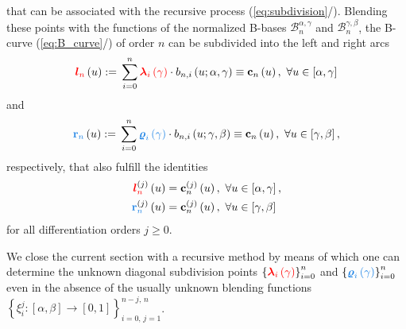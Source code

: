\documentclass[b5paper, twosided]{book}
\newcommand{\Black}[1]{{\color[rgb]{0.0, 0.0, 0.0}{#1}}}
\newcommand{\Red}[1]{{\color[rgb]{1.0, 0.0, 0.0}{#1}}}
\newcommand{\Blue}[1]{{\color[rgb]{0.1, 0.5, 0.9}{#1}}}
\DeclareRobustCommand{\mref}[1]{\ref{#1}{\relsize{-1}/\pageref{#1}}}
\begin{document}
that can be associated with the recursive process (\mref{eq:subdivision}). Blending these points with the functions of the normalized B-bases $\mathcal{B}_n^{\alpha,\gamma}$ and $\mathcal{B}_n^{\gamma, \beta}$, the B-curve (\mref{eq:B_curve}) of order $n$ can be subdivided into the left and right arcs 
\begin{equation}
\label{eq:left_arc}
\Red{\boldsymbol{l}_n}\left(u\right) := \displaystyle{}\sum_{i=0}^{n}
\Red{\boldsymbol{\lambda}_i\left(\gamma\right)
} \cdot b_{n,i}\left(u;\alpha,\gamma\right)\equiv\mathbf{c}_n\left(u\right),~\forall u\in\left[\alpha,\gamma\right]
\end{equation}
and
\begin{equation}
\label{eq:right_arc}
\Blue{\mathbf{r}_n}\left(u\right) := \displaystyle{}\sum_{i=0}^{n}
\Blue{
    \boldsymbol{\varrho}_i\left(\gamma\right)
}\cdot b_{n,i}\left(u;\gamma,\beta\right) \equiv \mathbf{c}_n\left(u\right),~\forall u\in\left[\gamma,\beta\right],
\end{equation}
respectively, that also fulfill the identities 
\begin{align}
\Red{\boldsymbol{l}_n^{\Black{\left(j\right)}}}\left(u\right)&=\mathbf{c}_n^{\left(j\right)}\left(u\right), ~\forall u \in \left[\alpha,\gamma\right],
\label{eq:subdivision_left_alpha}
\\
\Blue{\mathbf{r}_n^{\Black{\left(j\right)}}}\left(u\right)&=\mathbf{c}_n^{\left(j\right)}\left(u\right),~\forall u \in \left[\gamma, \beta\right]
\label{eq:subdivistion_right_beta}
\end{align}
for all differentiation orders $j\geq 0$.

We close the current section with a recursive method by means of which one can determine the unknown diagonal subdivision points  $\left\{\Red{\boldsymbol{\lambda}_i\left(\gamma\right)}\right\}_{i=0}^n$ and $\left\{\Blue{\boldsymbol{\varrho}_{i}\left(\gamma\right)}\right\}_{i=0}^n$ even in the absence of the usually unknown blending functions $\left\{\xi_i^j:\left[\alpha,\beta\right]\to\left[0,1\right]\right\}_{i=0,\,j=1}^{n-j,\,n}$.
\end{document}

